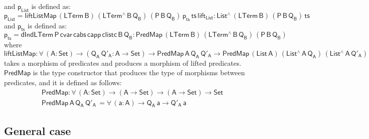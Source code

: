 \documentclass[9pt]{entcs} \usepackage{entcsmacro}
\begin{document}
and $\mathsf{p_{List}}$ is defined as:
\[
  \mathsf{p_{List} = liftListMap \, (LTerm\, B) \, (LTerm^{\wedge} \, B \, Q_B)\, 
    (P\,B\,Q_B)\, p_{ts} \, ts\, lift_{List}  : List^{\wedge}\, (LTerm\,B) \, (P\,B\,Q_B) \, ts}
\]
and $\mathsf{p_{ts}}$ is defined as:
\[
\mathsf{
  p_{ts} = dIndLTerm\, P\, cvar\, cabs\, capp\, clistc\, B\, Q_B :  PredMap\,(LTerm\,B) \,(LTerm^{\wedge}\, B\, Q_B) \, (P\,B\,Q_B)
  }
\]
where 
\[
\mathsf{liftListMap : \forall\, (A : Set) \to (Q_A \, Q'_A : A \to Set) 
  \to PredMap\,A\,Q_A\,Q'_A \to PredMap\,(List\,A) \,(List^{\wedge}\, A\, Q_A)\, (List^{\wedge}\, A\, Q'_A)}
\]
takes a morphism of predicates and produces a morphism of lifted predicates. 
$\mathsf{PredMap}$ is the type constructor that produces the type of morphisms between predicates, and it is defined as follows: 
\begin{align*}
  &\mathsf{PredMap : \forall\, (A : Set) \to (A \to Set) \to (A \to Set) \to Set } \\
  &\mathsf{PredMap \,A\, Q_A\,Q'_A\, = \forall\, (a : A) \to Q_A\,a \to Q'_A\,a}
\end{align*}



\subsection{General case}

\end{document}
